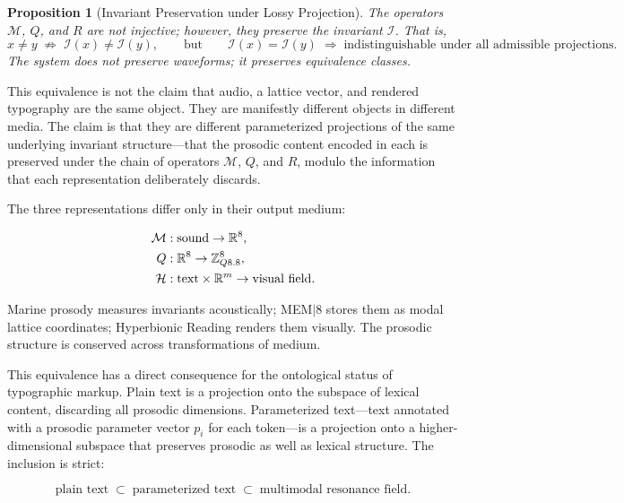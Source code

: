 \documentclass[12pt, a4paper]{article}
\newtheorem{proposition}{Proposition}
\begin{document}
\begin{proposition}[Invariant Preservation under Lossy Projection]
The operators $\mathcal{M}$, $Q$, and $R$ are not injective; however, they preserve the invariant $\mathcal{I}$. That is,
\begin{equation}
x \neq y \;\not\Rightarrow\; \mathcal{I}(x) \neq \mathcal{I}(y),
\qquad \text{but} \qquad
\mathcal{I}(x) = \mathcal{I}(y) \;\Rightarrow\; \text{indistinguishable under all admissible projections.}
\label{eq:lossy_invariant}
\end{equation}
The system does not preserve waveforms; it preserves equivalence classes.
\end{proposition}

This equivalence is not the claim that audio, a lattice vector, and rendered typography are the same object. They are manifestly different objects in different media. The claim is that they are different parameterized projections of the same underlying invariant structure---that the prosodic content encoded in each is preserved under the chain of operators $\mathcal{M}$, $Q$, and $R$, modulo the information that each representation deliberately discards.

The three representations differ only in their output medium:

\begin{align}
\mathcal{M} &: \text{sound} \to \mathbb{R}^8, \notag\\
Q &: \mathbb{R}^8 \to \mathbb{Z}_{Q8.8}^8, \notag\\
\mathcal{H} &: \text{text} \times \mathbb{R}^m \to \text{visual field}. \notag
\end{align}

Marine prosody measures invariants acoustically; MEM$|$8 stores them as modal lattice coordinates; Hyperbionic Reading renders them visually. The prosodic structure is conserved across transformations of medium.

This equivalence has a direct consequence for the ontological status of typographic markup. Plain text is a projection onto the subspace of lexical content, discarding all prosodic dimensions. Parameterized text---text annotated with a prosodic parameter vector $p_i$ for each token---is a projection onto a higher-dimensional subspace that preserves prosodic as well as lexical structure. The inclusion is strict:

\begin{equation}
\text{plain text} \;\subset\; \text{parameterized text} \;\subset\; \text{multimodal resonance field}.
\label{eq:inclusion}
\end{equation}
\end{document}
